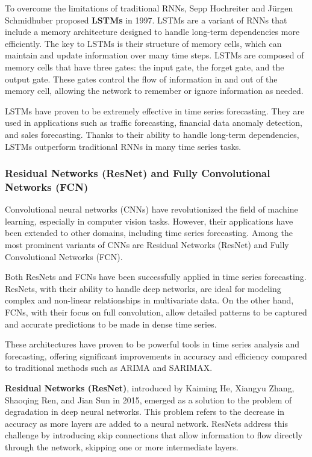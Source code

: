 To overcome the limitations of traditional RNNs, Sepp Hochreiter and Jürgen Schmidhuber proposed \textbf{LSTMs} in 1997\cite{LSTM}. LSTMs are a variant of RNNs that include a memory architecture designed to handle long-term dependencies more efficiently. The key to LSTMs is their structure of memory cells, which can maintain and update information over many time steps. LSTMs are composed of memory cells that have three gates: the input gate, the forget gate, and the output gate. These gates control the flow of information in and out of the memory cell, allowing the network to remember or ignore information as needed.

LSTMs have proven to be extremely effective in time series forecasting. They are used in applications such as traffic forecasting, financial data anomaly detection, and sales forecasting. Thanks to their ability to handle long-term dependencies, LSTMs outperform traditional RNNs in many time series tasks.
\vspace{10pt}

\subsubsection{Residual Networks (ResNet) and Fully Convolutional Networks (FCN)}
Convolutional neural networks (CNNs) have revolutionized the field of machine learning, especially in computer vision tasks. However, their applications have been extended to other domains, including time series forecasting. Among the most prominent variants of CNNs are Residual Networks (ResNet) and Fully Convolutional Networks (FCN).

Both ResNets and FCNs have been successfully applied in time series forecasting. ResNets, with their ability to handle deep networks, are ideal for modeling complex and non-linear relationships in multivariate data. On the other hand, FCNs, with their focus on full convolution, allow detailed patterns to be captured and accurate predictions to be made in dense time series.

These architectures have proven to be powerful tools in time series analysis and forecasting, offering significant improvements in accuracy and efficiency compared to traditional methods such as ARIMA and SARIMAX.
\vspace{10pt}

\textbf{Residual Networks (ResNet)}, introduced by Kaiming He, Xiangyu Zhang, Shaoqing Ren, and Jian Sun in 2015, emerged as a solution to the problem of degradation in deep neural networks. This problem refers to the decrease in accuracy as more layers are added to a neural network. ResNets address this challenge by introducing skip connections that allow information to flow directly through the network, skipping one or more intermediate layers.

